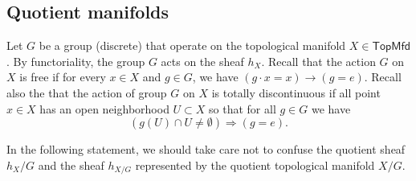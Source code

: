 \documentclass{tufte-book} %
\numberwithin{dummy}{section}
\newcommand{\Lrta}{\Longrightarrow}
\newcommand{\lrta}{\longrightarrow}
\begin{document}
\subsection{Quotient manifolds}
Let $G$ be a group (discrete) that operate on the topological manifold $X\in \mathsf{TopMfd}$. By functoriality, the group $G$ acts on the sheaf $h_X$. Recall that the action $G$ on $X$ is free if for every $x\in X$ and $g\in G$, we have $(g\cdot x=x)\lrta (g=e)$. Recall also the that the action of group $G$ on $X$ is totally discontinuous if all point $x\in X$ has an open neighborhood $U\subset X$ so that for all $g\in G$ we have
$$
(g(U)\cap U\neq \emptyset)\Lrta (g=e).
$$

In the following statement, we should take care not to confuse the quotient sheaf $h_X/G$ and the sheaf $h_{X/G}$ represented by the quotient topological manifold $X/G$.
\end{document}
